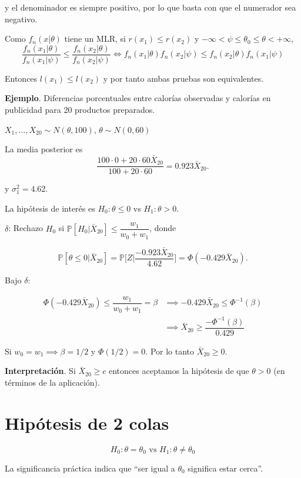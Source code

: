 \documentclass[
  12pt,
]{book}
\begin{document}
y el denominador es siempre positivo, por lo que basta con que el numerador sea negativo.

Como \(f_n(x|\theta)\) tiene un MLR, si \(r(x_1)\leq r(x_2)\) y \(-\infty <\psi\leq \theta_0\leq \theta<+\infty\),
\[\dfrac{f_n(x_1|\theta)}{f_n(x_1|\psi)}\leq\dfrac{f_n(x_2|\theta)}{f_n(x_2|\psi)} \Leftrightarrow f_n(x_1|\theta)f_n(x_2|\psi)\leq f_n(x_2|\theta)f_n(x_1|\psi)  \]

Entonces \(l(x_1)\leq l(x_2)\) y por tanto ambas pruebas son equivalentes.

\textbf{Ejemplo}. Diferencias porcentuales entre calorías observadas y calorías en publicidad para 20 productos preparados.

\(X_1,\dots,X_{20}\sim N(\theta,100)\), \(\theta\sim N(0,60)\)

La media posterior es
\[\dfrac{100\cdot 0 + 20\cdot 60\bar X_{20}}{100+20\cdot 60} = 0.923\bar X_{20}.\]

y \(\sigma_1^2 = 4.62\).

La hipótesis de interés es \(H_0:\theta\leq 0\) vs \(H_1:\theta>0\).

\(\delta\): Rechazo \(H_0\) si \(\mathbb P[H_0|\bar X_{20}]\leq \dfrac{w_1}{w_0+w_1}\), donde

\[\mathbb P[\theta\leq 0|\bar X_{20}] = \mathbb P\bigg[Z\bigg|\dfrac{-0.923\bar X_{20}}{4.62}\bigg] = \Phi(-0.429\bar X_{20}).\]

Bajo \(\delta\):

\begin{align*}
\Phi(-0.429\bar X_{20})\leq \dfrac{w_1}{w_0+w_1}=\beta & \implies -0.429\bar X_{20}\leq \Phi^{-1}(\beta)\\
&\implies \bar X_{20} \geq \dfrac{-\Phi^{-1}(\beta)}{0.429}
\end{align*}

Si \(w_0 = w_1 \implies \beta = 1/2\) y \(\Phi(1/2) =0\). Por lo tanto \(\bar X_{20}\geq 0\).

\textbf{Interpretación}. Si \(\bar X_{20}\geq c\) entonces aceptamos la hipótesis de que \(\theta>0\) (en términos de la aplicación).

\hypertarget{hipuxf3tesis-de-2-colas}{%
\section{Hipótesis de 2 colas}\label{hipuxf3tesis-de-2-colas}}

\[H_0: \theta = \theta_0 \text{ vs } H_1:\theta \ne \theta_0\]

La significancia práctica indica que ``ser igual a \(\theta_0\) significa estar cerca''.
\end{document}

